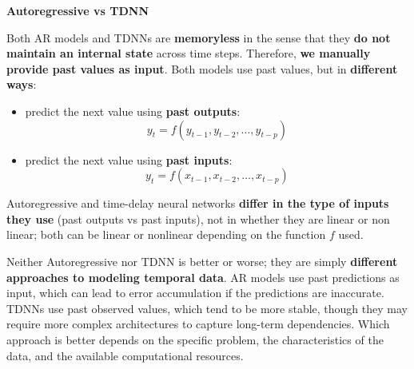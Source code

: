 \highspace
\begin{flushleft}
    \textcolor{Green3}{ \textbf{Autoregressive vs TDNN}}
\end{flushleft}
Both AR models and TDNNs are \textbf{memoryless} in the sense that they \textbf{do not maintain an internal state} across time steps. Therefore, \textbf{we manually provide past values as input}. Both models use past values, but in \textbf{different ways}:
\begin{itemize}
    \item {} predict the next value using \textbf{past outputs}:
    \begin{equation*}
        y_t = f\left(y_{t-1}, y_{t-2}, \dots, y_{t-p}\right)
    \end{equation*}


    \item {} predict the next value using \textbf{past inputs}:
    \begin{equation*}
        y_t = f\left(x_{t-1}, x_{t-2}, \dots, x_{t-p}\right)
    \end{equation*}
\end{itemize}
Autoregressive and time-delay neural networks \textbf{differ in the type of inputs they use} (past outputs vs past inputs), not in whether they are linear or non linear; both can be linear or nonlinear depending on the function $f$ used.

\highspace
Neither Autoregressive nor TDNN is better or worse; they are simply \textbf{different approaches to modeling temporal data}. AR models use past predictions as input, which can lead to error accumulation if the predictions are inaccurate. TDNNs use past observed values, which tend to be more stable, though they may require more complex architectures to capture long-term dependencies. Which approach is better depends on the specific problem, the characteristics of the data, and the available computational resources.
